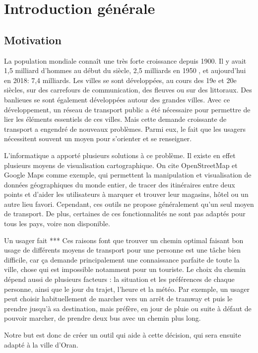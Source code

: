 \chapter{Introduction générale}
	\newpage	
	\section{Motivation}
		La population mondiale connaît une très forte croissance depuis 1900. 
		Il y avait 1,5 milliard d'hommes au début du siècle, 2,5 milliards en 1950 , et aujourd'hui en 2018: 7,4 milliards. 
		Les villes se sont développées, au cours des 19e et 20e siècles, sur des carrefours de communication, des fleuves ou sur des littoraux. Des banlieues se sont également développées autour des grandes villes. 
		Avec ce développement, un réseau de transport public a été nécessaire pour permettre de lier les éléments essentiels de ces villes. 
Mais cette demande croissante de transport a engendré de nouveaux problèmes. Parmi eux, le fait que les usagers nécessitent souvent un moyen pour s'orienter et se renseigner.

L'informatique a apporté plusieurs solutions à ce problème. Il existe en effet plusieurs moyens de visualisation cartographique.
On cite OpenStreetMap et Google Maps comme exemple, qui permettent la manipulation et visualisation de données géographiques du monde entier, de tracer des itinéraires entre deux points et d'aider les utilisateurs à marquer et trouver leur magasins, hôtel ou un autre lieu favori.
Cependant, ces outils ne propose généralement qu'un seul moyen de transport. De plus, certaines de ces fonctionnalités ne sont pas adaptés pour tous les pays, voire non disponible.

Un usager fait  ***
\newline
Ces raisons font que trouver un chemin optimal faisant bon usage de différents moyens de transport pour une personne est une tâche bien difficile, car ça demande principalement une connaissance parfaite de toute la ville, chose qui est impossible notamment pour un touriste.
Le choix du chemin dépend aussi de plusieurs facteurs : la situation et les préférences de chaque personne, ainsi que le jour du trajet, l'heure et la météo.
Par exemple, un usager peut choisir habituellement de marcher vers un arrêt de tramway et puis le prendre jusqu'à sa destination, mais préfère, en jour de pluie ou suite à défaut de pouvoir marcher, de prendre deux bus avec un chemin plus long.

Notre but est donc de créer un outil qui aide à cette décision, qui sera ensuite adapté à la ville d’Oran.

